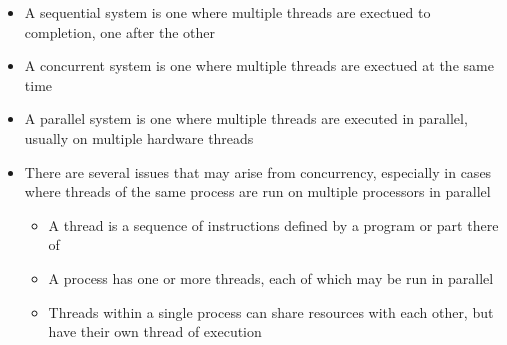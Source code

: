 
\begin{itemize}
  \item A sequential system is one where multiple threads are exectued to completion, one after the other
  \item A concurrent system is one where multiple threads are exectued at the same time
  \item A parallel system is one where multiple threads are executed in parallel, usually on multiple hardware threads
\end{itemize}

\begin{itemize}
  \item There are several issues that may arise from concurrency, especially in cases where threads of the same process are run on multiple processors in parallel
  \begin{itemize}
    \item A thread is a sequence of instructions defined by a program or part there of
    \item A process has one or more threads, each of which may be run in parallel
    \item Threads within a single process can share resources with each other, but have their own thread of execution
  \end{itemize}
\end{itemize}